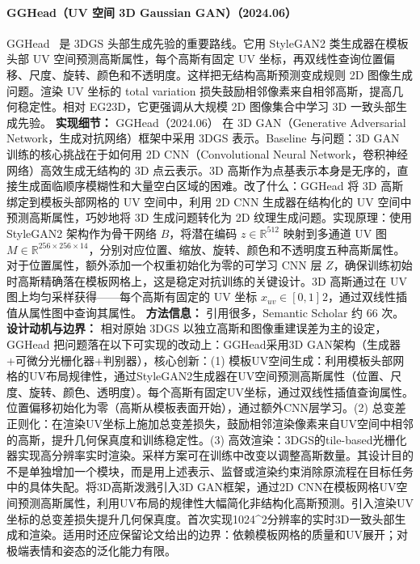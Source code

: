 \paragraph{GGHead（UV 空间 3D Gaussian GAN）（2024.06）}
GGHead~\cite{2406_09377} 是 3DGS 头部生成先验的重要路线。它用 StyleGAN2 类生成器在模板头部 UV 空间预测高斯属性，每个高斯有固定 UV 坐标，再双线性查询位置偏移、尺度、旋转、颜色和不透明度。这样把无结构高斯预测变成规则 2D 图像生成问题。渲染 UV 坐标的 total variation 损失鼓励相邻像素来自相邻高斯，提高几何稳定性。相对 EG23D，它更强调从大规模 2D 图像集合中学习 3D 一致头部生成先验。
\textbf{实现细节：} GGHead（2024.06） 在 3D GAN（Generative Adversarial Network，生成对抗网络）框架中采用 3DGS 表示。Baseline 与问题：3D GAN 训练的核心挑战在于如何用 2D CNN（Convolutional Neural Network，卷积神经网络）高效生成无结构的 3D 点云表示。3D 高斯作为点基表示本身是无序的，直接生成面临顺序模糊性和大量空白区域的困难。改了什么：GGHead 将 3D 高斯绑定到模板头部网格的 UV 空间中，利用 2D CNN 生成器在结构化的 UV 空间中预测高斯属性，巧妙地将 3D 生成问题转化为 2D 纹理生成问题。实现原理：使用 StyleGAN2 架构作为骨干网络 $B$，将潜在编码 $z \in \mathbb{R}^{512}$ 映射到多通道 UV 图 $M \in \mathbb{R}^{256 \times 256 \times 14}$，分别对应位置、缩放、旋转、颜色和不透明度五种高斯属性。对于位置属性，额外添加一个权重初始化为零的可学习 CNN 层 $Z$，确保训练初始时高斯精确落在模板网格上，这是稳定对抗训练的关键设计。3D 高斯通过在 UV 图上均匀采样获得——每个高斯有固定的 UV 坐标 $x_{uv} \in [0,1]^{}2$，通过双线性插值从属性图中查询其属性。
\textbf{方法信息：} 引用很多，Semantic Scholar 约 66 次。
\textbf{设计动机与边界：} 相对原始 3DGS 以独立高斯和图像重建误差为主的设定，GGHead 把问题落在以下可实现的改动上：GGHead采用3D GAN架构（生成器+可微分光栅化器+判别器），核心创新：(1) 模板UV空间生成：利用模板头部网格的UV布局规律性，通过StyleGAN2生成器在UV空间预测高斯属性（位置、尺度、旋转、颜色、透明度）。每个高斯有固定UV坐标，通过双线性插值查询属性。位置偏移初始化为零（高斯从模板表面开始），通过额外CNN层学习。(2) 总变差正则化：在渲染UV坐标上施加总变差损失，鼓励相邻渲染像素来自UV空间中相邻的高斯，提升几何保真度和训练稳定性。(3) 高效渲染：3DGS的tile-based光栅化器实现高分辨率实时渲染。采样方案可在训练中改变以调整高斯数量。其设计目的不是单独增加一个模块，而是用上述表示、监督或渲染约束消除原流程在目标任务中的具体失配。将3D高斯泼溅引入3D GAN框架，通过2D CNN在模板网格UV空间预测高斯属性，利用UV布局的规律性大幅简化非结构化高斯预测。引入渲染UV坐标的总变差损失提升几何保真度。首次实现1024\^{}2分辨率的实时3D一致头部生成和渲染。适用时还应保留论文给出的边界：依赖模板网格的质量和UV展开；对极端表情和姿态的泛化能力有限。
